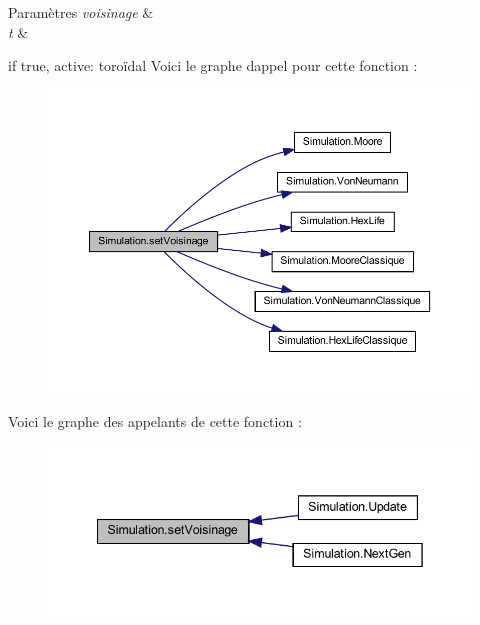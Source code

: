 \begin{DoxyParams}{Paramètres}
{\em voisinage} & \\
\hline
{\em t} & \\
\hline
\end{DoxyParams}
if true, active\+: toroïdal Voici le graphe d\textquotesingle{}appel pour cette fonction \+:
\nopagebreak
\begin{figure}[H]
\begin{center}
\leavevmode
\includegraphics[width=350pt]{class_simulation_a9238f4dcd56a4945017fda48a76a3dc8_cgraph}
\end{center}
\end{figure}
Voici le graphe des appelants de cette fonction \+:
\nopagebreak
\begin{figure}[H]
\begin{center}
\leavevmode
\includegraphics[width=342pt]{class_simulation_a9238f4dcd56a4945017fda48a76a3dc8_icgraph}
\end{center}
\end{figure}
\mbox{\label{class_simulation_af5fd57d6f657f07bc0fac7085832dc82}} 
